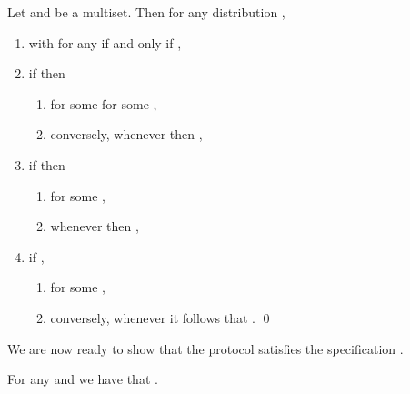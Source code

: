 \documentclass{LMCS}
\begin{document}
\begin{prop}
\label{prop:routing.impl.weak}
Let  and  be a multiset. 
Then for any distribution ,

\begin{enumerate}[label=(\roman*)]
\item  with 
 for any  
if and only if , 
\item if  then 
\begin{enumerate}[label=(\roman*)] 
\item  for some 
 for some , 
\item conversely, whenever  then 
,
\end{enumerate}

\item if  then 
\begin{enumerate}[label=(\roman*)]
\item  for some 
, 
\item whenever  then 
, 
\end{enumerate}

\item if , 
\begin{enumerate}
\item  for 
some , 
\item conversely, whenever  it follows that .
\qed
\end{enumerate}
\end{enumerate}
\end{prop}

\noindent We are now ready to show that the protocol  
satisfies the specification .
\begin{thm}
\label{thm:routing.equivalence}
For any  and  
we have that . 
\end{thm}
\end{document}
